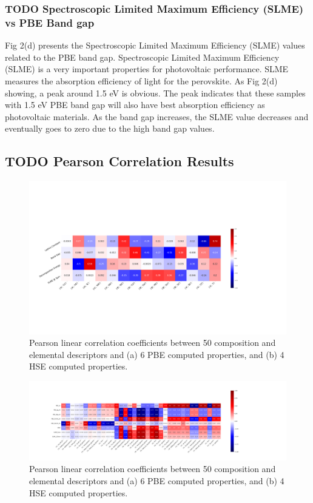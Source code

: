 \documentclass[twoside, twocolumn, 9pt, draft]{article}
\begin{document}
\subsubsection*{{\bfseries\sffamily TODO} Spectroscopic Limited Maximum Efficiency (SLME) vs PBE Band gap}
\label{sec:org67db7d3}
Fig 2(d) presents the Spectroscopic Limited Maximum Efficiency (SLME)
values related to the PBE band gap. Spectroscopic Limited Maximum
Efficiency (SLME) is a very important properties for photovoltaic
performance. SLME measures the absorption efficiency of light for the
perovskite. As Fig 2(d) showing, a peak around 1.5 eV is obvious. The
peak indicates that these samples with 1.5 eV PBE band gap will also
have best absorption efficiency as photovoltaic materials. As the band
gap increases, the SLME value decreases and eventually goes to zero due
to the high band gap values.

\subsection*{{\bfseries\sffamily TODO} Pearson Correlation Results}
\label{sec:org9c5f8f3}
\begin{figure}
\centering
\includegraphics[width=.9\linewidth]{PBE_v_comp_pearson2.png}
\caption{\label{fig:pearson} Pearson linear correlation coefficients between 50 composition and elemental descriptors and (a) 6 PBE computed properties, and (b) 4 HSE computed properties.}
\end{figure}
\begin{figure}
\centering
\includegraphics[width=.9\linewidth]{PBE_v_site_prop_pearson.png}
\caption{\label{fig:pearson} Pearson linear correlation coefficients between 50 composition and elemental descriptors and (a) 6 PBE computed properties, and (b) 4 HSE computed properties.}
\end{figure}
\end{document}
